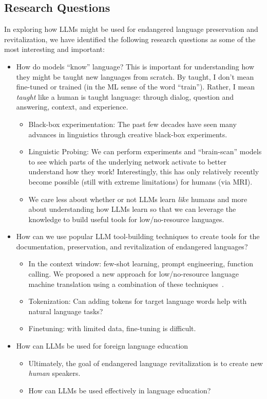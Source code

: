 \documentclass{article}
\begin{document}
\subsection*{Research Questions}
In exploring how LLMs might be used for endangered language preservation and revitalization, we have identified the following research questions as some of the most interesting and important:
\begin{itemize}
    \item How do models ``know'' language? This is important for understanding how they might be taught new languages from scratch. By taught, I don't mean fine-tuned or trained (in the ML sense of the word ``train''). Rather, I mean \textit{taught} like a human is taught language: through dialog, question and answering, context, and experience.
    \begin{itemize}
        \item Black-box experimentation: The past few decades have seen many advances in linguistics through creative black-box experiments.
        \item Linguistic Probing: We can perform experiments and ``brain-scan'' models to see which parts of the underlying network activate to better understand how they work! Interestingly, this has only relatively recently become possible (still with extreme limitations) for humans (via MRI).
        \item We care less about whether or not LLMs learn \textit{like} humans and more about understanding how LLMs learn so that we can leverage the knowledge to build useful tools for low/no-resource languages.
    \end{itemize}
    \item How can we use popular LLM tool-building techniques to create tools for the documentation, preservation, and revitalization of endangered languages?
    \begin{itemize}
        \item In the context window: few-shot learning, prompt engineering, function calling. We proposed a new approach for low/no-resource language machine translation using a combination of these techniques~\cite{llm-rbmt}.
        \item Tokenization: Can adding tokens for target language words help with natural language tasks?
        \item Finetuning: with limited data, fine-tuning is difficult.
    \end{itemize}
    \item How can LLMs be used for foreign language education
    \begin{itemize}
        \item Ultimately, the goal of endangered language revitalization is to create new \textit{human} speakers.
        \item How can LLMs be used effectively in language education?
    \end{itemize}
\end{itemize}
\end{document}
